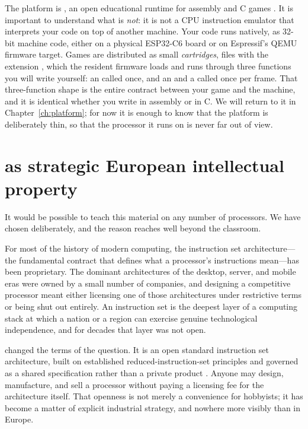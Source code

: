 The platform is \prg, an open educational runtime for \riscv assembly and C games
\citep{prg32repo}. It is important to understand what \prg is \emph{not}: it is
not a CPU instruction emulator that interprets your code on top of another
machine. Your code runs natively, as 32-bit \riscv machine code, either on a
physical ESP32\nobreakdash-C6 board or on Espressif's QEMU firmware target. Games are
distributed as small \emph{cartridges}, files with the extension ,
which the resident firmware loads and runs through three functions you will write
yourself: an  called once, and an  and a 
called once per frame. That three-function shape is the entire contract between
your game and the machine, and it is identical whether you write in assembly or
in C. We will return to it in Chapter~\ref{ch:platform}; for now it is enough to
know that the platform is deliberately thin, so that the processor it runs on is
never far out of view.

\section{\riscv as strategic European intellectual property}

It would be possible to teach this material on any number of processors. We have
chosen \riscv deliberately, and the reason reaches well beyond the classroom.

For most of the history of modern computing, the instruction set architecture---
the fundamental contract that defines what a processor's instructions mean---has
been proprietary. The dominant architectures of the desktop, server, and mobile
eras were owned by a small number of companies, and designing a competitive
processor meant either licensing one of those architectures under restrictive
terms or being shut out entirely. An instruction set is the deepest layer of a
computing stack at which a nation or a region can exercise genuine technological
independence, and for decades that layer was not open.

\riscv changed the terms of the question. It is an open standard instruction set
architecture, built on established reduced-instruction-set principles and
governed as a shared specification rather than a private product
\citep{riscvisa}. Anyone may design, manufacture, and sell a \riscv processor
without paying a licensing fee for the architecture itself. That openness is not
merely a convenience for hobbyists; it has become a matter of explicit industrial
strategy, and nowhere more visibly than in Europe.

